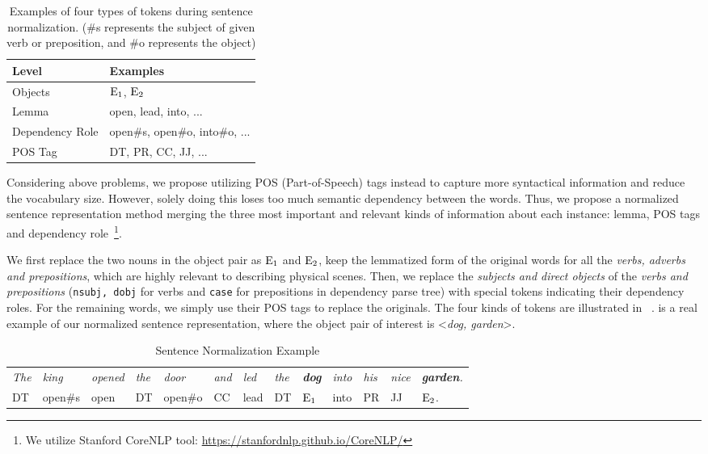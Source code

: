 \begin{table}[th]
	\centering
	\begin{tabular}{l|l}
		\hline
		\textbf{Level}	&  \textbf{Examples}\\ 		\hline
		Objects	& $\textnormal{E}_1$, $\textnormal{E}_2$ \\ 		\hline
		Lemma & open, lead, into, ...\\ \hline 
		Dependency Role	& open\#s, open\#o, into\#o, ... \\ 		\hline 
		POS Tag	& DT, PR, CC, JJ, ... \\ 		\hline 
	\end{tabular}
	\caption{Examples of four types of tokens during sentence normalization. (\#s represents the subject of given verb or preposition, and \#o represents the object)}
	\label{tab:norm}
\end{table}

Considering above problems, we propose utilizing POS (Part-of-Speech) tags instead to capture more syntactical information and reduce the vocabulary size. 
However, solely doing this loses too much semantic dependency between the words. 
Thus, we propose a normalized sentence representation method merging the three most important and relevant kinds of information about each instance: lemma, POS tags and dependency role~\footnote{We utilize Stanford CoreNLP tool: \url{https://stanfordnlp.github.io/CoreNLP/}}. 

We first replace the two nouns in the object pair as $\textnormal{E}_1$ and $\textnormal{E}_2$, keep the lemmatized form of the original words for all the \textit{verbs, adverbs and prepositions}, which are highly relevant to describing physical scenes.
Then, we replace the \textit{subjects and direct objects} of the \textit{verbs and prepositions} (\texttt{nsubj, dobj} for verbs and \texttt{case} for prepositions in dependency parse tree) with special tokens indicating their dependency roles. 
For the remaining words, we simply use their POS tags to replace the originals. 
The four kinds of tokens are illustrated in ~.
 is a real example of our normalized sentence representation, where the object pair of interest is \textless \textit{dog, garden}\textgreater. 
\begin{table*}[th]
	\centering
	\begin{tabular}{lllllllllllll}
		\hline
		\textit{The }&\textit{king }&\textit{opened }&\textit{the}&\textit{door}&\textit{and}& \textit{led}& \textit{the}& \textit{\textbf{dog} }& \textit{into }& \textit{his }& \textit{nice }& \textit{\textbf{garden}.}\\		 
		DT & open\#s & open & DT & open\#o & CC& lead& DT &$\textnormal{E}_1$ & into & PR & JJ& $\textnormal{E}_2$.\\	 \hline
	\end{tabular}
	\caption{Sentence Normalization Example}
	\label{tab:norm_eg}
\end{table*} 
